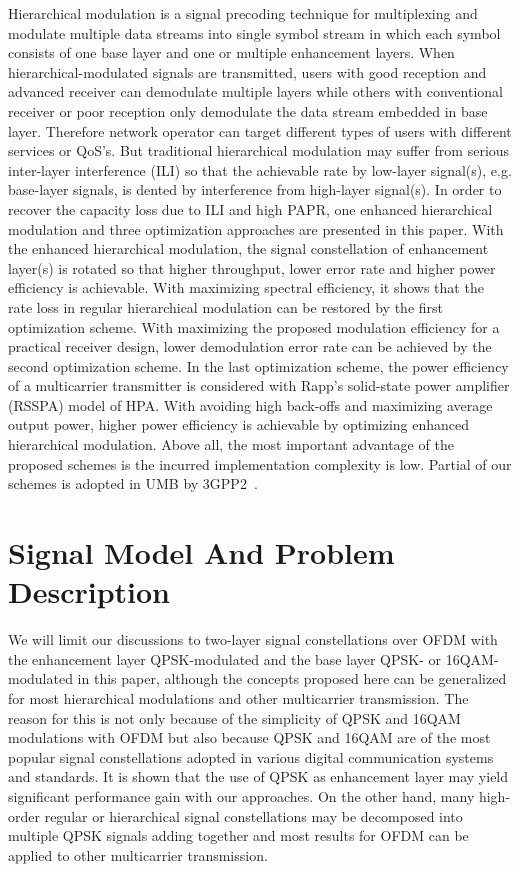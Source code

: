\documentclass[10pt,fleqn, twocolumn]{IEEEtran}
\begin{document}
Hierarchical modulation is a signal precoding technique for
multiplexing and modulate multiple data streams into single symbol
stream in which each symbol consists of one base layer and one or
multiple enhancement layers. When hierarchical-modulated signals
are transmitted, users with good reception and advanced receiver
can demodulate multiple layers while others with conventional
receiver or poor reception only demodulate the data stream
embedded in base layer. Therefore network operator can target
different types of users with different services or QoS's. But
traditional hierarchical modulation may suffer from serious
inter-layer interference (ILI) so that the achievable rate by
low-layer signal(s), e.g. base-layer signals, is dented by
interference from high-layer signal(s). In order to recover the
capacity loss due to ILI and high PAPR, one enhanced hierarchical
modulation and three optimization approaches are presented in this
paper. With the enhanced hierarchical modulation, the signal
constellation of enhancement layer(s) is rotated so that higher
throughput, lower error rate and higher power efficiency is
achievable. With maximizing spectral efficiency, it shows that the
rate loss in regular hierarchical modulation can be restored by
the first optimization scheme. With maximizing the proposed
modulation efficiency for a practical receiver design, lower
demodulation error rate can be achieved by the second optimization
scheme. In the last optimization scheme, the power efficiency of a
multicarrier transmitter is considered with Rapp's solid-state
power amplifier (RSSPA) model of HPA. With avoiding high back-offs
and maximizing average output power, higher power efficiency is
achievable by optimizing enhanced hierarchical modulation. Above
all, the most important advantage of the proposed schemes is the
incurred implementation complexity is low. Partial of our schemes
is adopted in UMB by 3GPP2~\cite{UMB}.

\section{Signal Model And Problem Description}
We will limit our discussions to two-layer signal constellations
over OFDM with the enhancement layer QPSK-modulated and the base
layer QPSK- or 16QAM-modulated in this paper, although the
concepts proposed here can be generalized for most hierarchical
modulations and other multicarrier transmission. The reason for
this is not only because of the simplicity of QPSK and 16QAM
modulations with OFDM but also because QPSK and 16QAM are of the
most popular signal constellations adopted in various digital
communication systems and standards. It is shown that the use of
QPSK as enhancement layer may yield significant performance gain
with our approaches. On the other hand, many high-order regular or
hierarchical signal constellations may be decomposed into multiple
QPSK signals adding together and most results for OFDM can be
applied to other multicarrier transmission.
\end{document}
